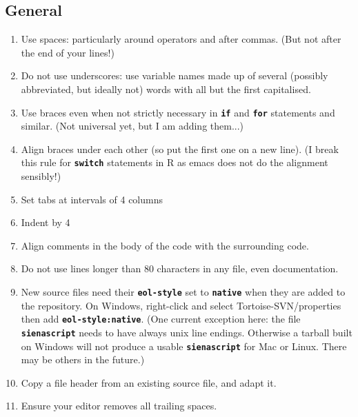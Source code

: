 \documentclass[12pt, a4paper]{article}
\renewcommand{\=}{\,=\,}
\newcommand{\+}{\,+\,}
\newcommand{\sfn}[1]{\textbf{\texttt{#1}}}
\begin{document}
\subsection{General}
\begin{enumerate}
\item Use spaces: particularly around operators and after commas. (But
  not after the end of your lines!)
\item Do not use underscores: use variable names made up of several (possibly
  abbreviated, but ideally not) words with all but the first capitalised.
\item Use braces even when not strictly necessary in \sfn{if} and \sfn{for}
  statements and similar. (Not universal yet, but I am adding them...)
\item Align braces under each other (so put the first one on a new line). (I
  break this rule for \sfn{switch} statements in R as emacs does not do the
  alignment sensibly!)
\item Set tabs at intervals of 4 columns
\item Indent by 4
\item Align comments in the body of the code with the surrounding code.
\item Do not use lines longer than 80 characters in any file, even
  documentation.
\item New source files need their \sfn{eol-style} set to \sfn{native} when they
  are added to the repository. On Windows, right-click and select
  Tortoise-SVN/properties then add \sfn{eol-style:native}.  (One current
  exception here: the file \sfn{sienascript} needs to have always unix line
  endings. Otherwise a tarball built on Windows will not produce a usable
  \sfn{sienascript} for Mac or Linux. There may be others in the future.)
\item Copy a file header from an existing source file, and adapt it.
\item Ensure your editor removes all trailing spaces.
\end{enumerate}
\end{document}
